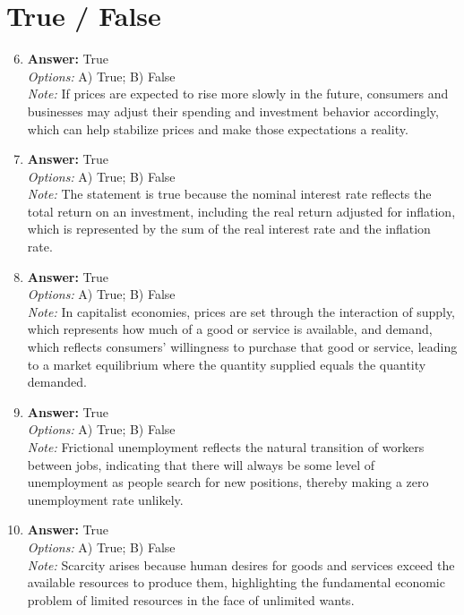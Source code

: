 \documentclass[12pt]{article}
\begin{document}
\section*{True / False}
\begin{enumerate}[label=\arabic*.]
\setcounter{enumi}{5}
\item \textbf{Answer:} True
\\ \textit{Options:} A) True; B) False
\\ \textit{Note:} If prices are expected to rise more slowly in the future, consumers and businesses may adjust their spending and investment behavior accordingly, which can help stabilize prices and make those expectations a reality.
\item \textbf{Answer:} True
\\ \textit{Options:} A) True; B) False
\\ \textit{Note:} The statement is true because the nominal interest rate reflects the total return on an investment, including the real return adjusted for inflation, which is represented by the sum of the real interest rate and the inflation rate.
\item \textbf{Answer:} True
\\ \textit{Options:} A) True; B) False
\\ \textit{Note:} In capitalist economies, prices are set through the interaction of supply, which represents how much of a good or service is available, and demand, which reflects consumers' willingness to purchase that good or service, leading to a market equilibrium where the quantity supplied equals the quantity demanded.
\item \textbf{Answer:} True
\\ \textit{Options:} A) True; B) False
\\ \textit{Note:} Frictional unemployment reflects the natural transition of workers between jobs, indicating that there will always be some level of unemployment as people search for new positions, thereby making a zero unemployment rate unlikely.
\item \textbf{Answer:} True
\\ \textit{Options:} A) True; B) False
\\ \textit{Note:} Scarcity arises because human desires for goods and services exceed the available resources to produce them, highlighting the fundamental economic problem of limited resources in the face of unlimited wants.
\end{enumerate}
\end{document}
